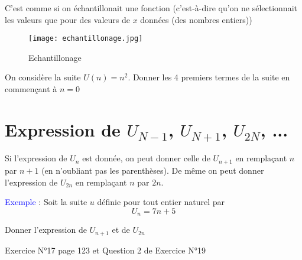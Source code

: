\documentclass[a4paper,12pt]{article}
\begin{document}
C'est comme si on échantillonait une fonction (c'est-à-dire qu'on ne sélectionnait les valeurs que pour des valeurs de $x$ données (des nombres entiers))

\begin{figure}[H]
  \centering
  \texttt{[image: echantillonage.jpg]}
  \caption{\label{} Echantillonage}
\end{figure}

\begin{tcolorbox}[colback=blue!10!white, colframe=blue!75!black, title=Exercices]
  On considère la suite $U(n) = n^2$. Donner les 4 premiers termes de la suite en commençant à $n = 0$

  \trou{
    \[
    \left\{
      \begin{array}{ll}
            U(0) = 0 \\
            U(1) = 1^2 = 1 \\
            U(2) = 2^2 = 4 \\
            U(3) = 3^2 = 9 \\
        \end{array}
      \right.
    \]
  }{\vspace{5em}}

\end{tcolorbox}

\section*{Expression de $U_{N-1}$, $U_{N+1}$, $U_{2N}$, ...}

Si l'expression de $U_n$ est donnée, on peut donner celle de $U_{n+1}$ en remplaçant $n$ par $n + 1$ (en n'oubliant pas les parenthèses).
De même on peut donner l'expression de $U_{2n}$ en remplaçant $n$ par $2n$. \par
\vspace{1em}
\textcolor{blue}{Exemple} : Soit la suite $u$ définie pour tout entier naturel par
\[
  U_n = 7n + 5
\] \par

Donner l'expression de $U_{n+1}$ et de $U_{2n}$

\trou{\vspace{5em}}{\vspace{5em}}

\begin{tcolorbox}[colback=blue!10!white, colframe=blue!75!black, title=Exercices]
  Exercice N°17 page 123 et Question 2 de Exercice N°19
\end{tcolorbox}
\end{document}
